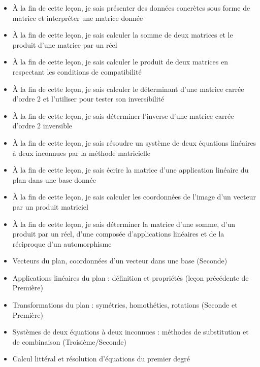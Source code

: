 \documentclass[11pt]{article}
\begin{document}
\begin{objectifs}
\begin{itemize}
\item À la fin de cette leçon, je sais présenter des données concrètes sous forme de matrice et interpréter une matrice donnée
\item À la fin de cette leçon, je sais calculer la somme de deux matrices et le produit d'une matrice par un réel
\item À la fin de cette leçon, je sais calculer le produit de deux matrices en respectant les conditions de compatibilité
\item À la fin de cette leçon, je sais calculer le déterminant d'une matrice carrée d'ordre 2 et l'utiliser pour tester son inversibilité
\item À la fin de cette leçon, je sais déterminer l'inverse d'une matrice carrée d'ordre 2 inversible
\item À la fin de cette leçon, je sais résoudre un système de deux équations linéaires à deux inconnues par la méthode matricielle
\item À la fin de cette leçon, je sais écrire la matrice d'une application linéaire du plan dans une base donnée
\item À la fin de cette leçon, je sais calculer les coordonnées de l'image d'un vecteur par un produit matriciel
\item À la fin de cette leçon, je sais déterminer la matrice d'une somme, d'un produit par un réel, d'une composée d'applications linéaires et de la réciproque d'un automorphisme
\end{itemize}
\end{objectifs}

\begin{prerequis}
\begin{itemize}
\item Vecteurs du plan, coordonnées d'un vecteur dans une base (Seconde)
\item Applications linéaires du plan : définition et propriétés (leçon précédente de Première)
\item Transformations du plan : symétries, homothéties, rotations (Seconde et Première)
\item Systèmes de deux équations à deux inconnues : méthodes de substitution et de combinaison (Troisième/Seconde)
\item Calcul littéral et résolution d'équations du premier degré
\end{itemize}
\end{prerequis}
\end{document}

